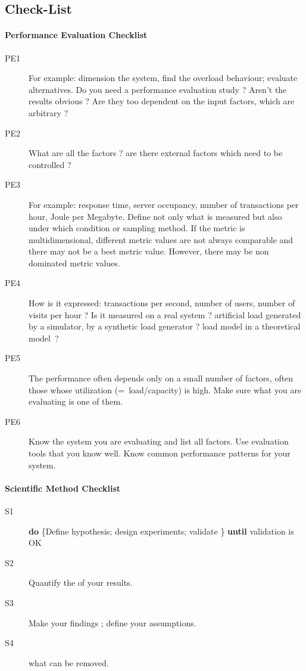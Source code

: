\subsection{Check-List}
\begin{sh}
\paragraph{Performance Evaluation Checklist}
 \begin{description}
  \item[PE1]  For example: dimension the system, find the overload
  behaviour; evaluate alternatives. Do you need a performance evaluation study  ? Aren't the results obvious ?
Are they too dependent on the input factors, which are arbitrary ?
  \item[PE2] 
  What are all the factors ? are there external factors which need to be controlled ?
  \item[PE3] 
  For example: response time, server occupancy, number of
  transactions per hour, Joule per
  Megabyte. Define not only what is measured but also under which condition
  or sampling method. If the metric is multidimensional, different
  metric values are not always comparable and there may not be
  a best metric value. However, there may be non dominated
  metric values.
  \item[PE4]  How is it expressed: transactions per second, number of users, number of visits per hour ? Is it measured on a real system ? artificial load generated by a simulator, by a synthetic load
  generator ? load model in a theoretical model~?
  \item[PE5]  The performance often depends only on a small
  number of factors, often those whose utilization (=~load/capacity) is high. Make sure what you are evaluating is one of them.
  \item [PE6] 
  Know the system you are evaluating and list all factors.
  Use evaluation tools that you know well. Know
  common performance patterns for your system.
\end{description}
\paragraph{Scientific Method Checklist}
\begin{description}
  \item[S1]  \newline
  \textbf{do} \{Define hypothesis; design experiments; validate \}
   \textbf{until} validation is OK
  \item[S2] Quantify the  of your results.
  \item[S3] Make your findings ; define your assumptions.
  \item[S4]  what can be removed.
\end{description}
\end{sh}
